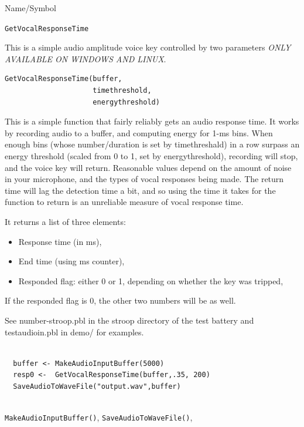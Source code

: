 \begin{desc}{Name/Symbol}
\item[Name/Symbol]	\verb+GetVocalResponseTime+

\item[Description] This is a simple audio amplitude voice key controlled by two parameters  \emph{ONLY AVAILABLE ON WINDOWS AND LINUX}.

\item[Usage]
\begin{verbatim}
GetVocalResponseTime(buffer, 
                     timethreshold,
                     energythreshold)
\end{verbatim}
This is a simple function that fairly reliably gets an audio response time.  It works by recording audio to a buffer, and computing energy for 1-ms bins.  When enough bins (whose number/duration is set by timethreshald) in a row surpass an energy threshold (scaled from 0 to 1, set by energythreshold), recording will stop, and the voice key will return.  Reasonable values depend on the amount of noise in your microphone, and the types of vocal responses being made.  The return time will lag the detection time a bit, and so using the time it takes for the function to return is an unreliable measure of vocal response time.


It returns a list of three elements:

\begin{itemize}
\item Response time (in ms),
\item End time (using ms counter),
\item Responded flag: either 0 or 1, depending on whether the key was tripped,
\end{itemize}

If the responded flag is 0, the other two numbers will be as well.

See number-stroop.pbl in the stroop directory of the test battery and testaudioin.pbl in demo/ for examples.


\item[Example]	
\begin{verbatim}

  buffer <- MakeAudioInputBuffer(5000)
  resp0 <-  GetVocalResponseTime(buffer,.35, 200)
  SaveAudioToWaveFile("output.wav",buffer)
  
\end{verbatim}
\item[See Also] 	\verb+MakeAudioInputBuffer()+, \verb+SaveAudioToWaveFile()+,
\end{desc}




